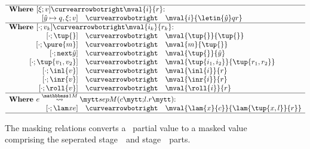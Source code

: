 
\begin{figure}
\begin{abstrsyn}
\[\begin{array}{rrrl}
\hline
\multicolumn{4}{l}  {\text{\bf Where } [\xi;v] \vsplito \mval {i} {r} \text{:}}          \\
\hspace{0.25in} 
&[\hat y \mapsto q,\xi;v]  &\vsplito& \mval  {i}             {\letin {\hat y} q {r}}      \\
\hline
\multicolumn{4}{l}  {\text{\bf Where } [\cdot;v_k] \vsplito \mval {i_k} {r_k} \text{:}}  \\
&[\cdot;\tup{}]            &\vsplito& \mval  {\tup{}}        {\tup{}}                     \\
&[\cdot;\pure{m}]          &\vsplito& \mval  {m}             {\tup{}}                     \\
&[\cdot;\next{\hat y}]     &\vsplito& \mval  {\tup{}}            {\hat y}                     \\
&[\cdot;\tup{v_1,v_2}]         &\vsplito& \mval  {\tup{i_1,i_2}}     {\tup{r_1,r_2}}                  \\
&[\cdot;\inl{v}]           &\vsplito& \mval  {\inl{i}}       {r}                          \\
&[\cdot;\inr{v}]           &\vsplito& \mval  {\inr{i}}       {r}                          \\
&[\cdot;\roll{v}]          &\vsplito& \mval  {\roll{i}}      {r}                          \\
\hline
\multicolumn{4}{l}  {\text{\bf Where } \splitone e A {c}{l.r} \text{:}}                   \\
&[\cdot;\lam xe]           &\vsplito& \mval  {\lam {x} {c}}  {\lam {\tup{x,l}} {r}}			\\
\hline
\end{array}\]
\end{abstrsyn}
\caption{The masking relations converts a \lang\ partial value to a masked value
comprising the seperated stage~\bbone\ and stage~\bbtwo\ parts.}
\label{fig:valMask}
\end{figure}
